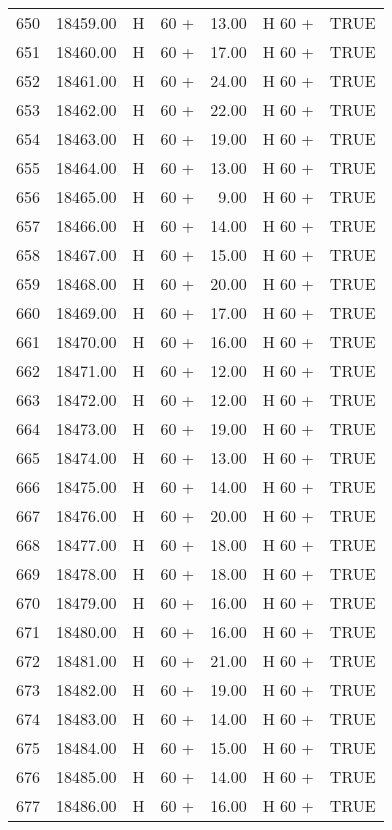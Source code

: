 \begin{table}[ht]
\begin{tabular}{rrllrll}
  650 & 18459.00 & H & 60 + & 13.00 & H 60 + & TRUE \\ 
  651 & 18460.00 & H & 60 + & 17.00 & H 60 + & TRUE \\ 
  652 & 18461.00 & H & 60 + & 24.00 & H 60 + & TRUE \\ 
  653 & 18462.00 & H & 60 + & 22.00 & H 60 + & TRUE \\ 
  654 & 18463.00 & H & 60 + & 19.00 & H 60 + & TRUE \\ 
  655 & 18464.00 & H & 60 + & 13.00 & H 60 + & TRUE \\ 
  656 & 18465.00 & H & 60 + & 9.00 & H 60 + & TRUE \\ 
  657 & 18466.00 & H & 60 + & 14.00 & H 60 + & TRUE \\ 
  658 & 18467.00 & H & 60 + & 15.00 & H 60 + & TRUE \\ 
  659 & 18468.00 & H & 60 + & 20.00 & H 60 + & TRUE \\ 
  660 & 18469.00 & H & 60 + & 17.00 & H 60 + & TRUE \\ 
  661 & 18470.00 & H & 60 + & 16.00 & H 60 + & TRUE \\ 
  662 & 18471.00 & H & 60 + & 12.00 & H 60 + & TRUE \\ 
  663 & 18472.00 & H & 60 + & 12.00 & H 60 + & TRUE \\ 
  664 & 18473.00 & H & 60 + & 19.00 & H 60 + & TRUE \\ 
  665 & 18474.00 & H & 60 + & 13.00 & H 60 + & TRUE \\ 
  666 & 18475.00 & H & 60 + & 14.00 & H 60 + & TRUE \\ 
  667 & 18476.00 & H & 60 + & 20.00 & H 60 + & TRUE \\ 
  668 & 18477.00 & H & 60 + & 18.00 & H 60 + & TRUE \\ 
  669 & 18478.00 & H & 60 + & 18.00 & H 60 + & TRUE \\ 
  670 & 18479.00 & H & 60 + & 16.00 & H 60 + & TRUE \\ 
  671 & 18480.00 & H & 60 + & 16.00 & H 60 + & TRUE \\ 
  672 & 18481.00 & H & 60 + & 21.00 & H 60 + & TRUE \\ 
  673 & 18482.00 & H & 60 + & 19.00 & H 60 + & TRUE \\ 
  674 & 18483.00 & H & 60 + & 14.00 & H 60 + & TRUE \\ 
  675 & 18484.00 & H & 60 + & 15.00 & H 60 + & TRUE \\ 
  676 & 18485.00 & H & 60 + & 14.00 & H 60 + & TRUE \\ 
  677 & 18486.00 & H & 60 + & 16.00 & H 60 + & TRUE \\ 

\end{tabular}
\end{table}
